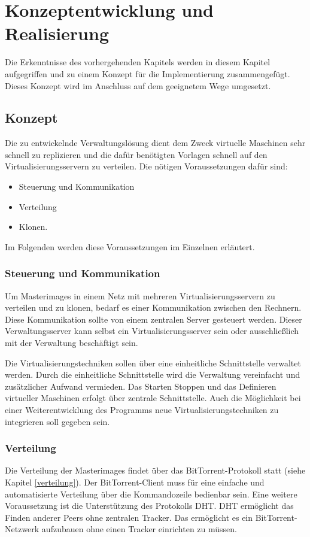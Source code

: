 \chapter{Konzeptentwicklung und Realisierung}
Die Erkenntnisse des vorhergehenden Kapitels werden in diesem Kapitel aufgegriffen und zu einem Konzept für die Implementierung zusammengefügt. Dieses Konzept wird im Anschluss auf dem geeignetem Wege umgesetzt.
\section{Konzept}
Die zu entwickelnde Verwaltungslösung dient dem Zweck virtuelle Maschinen sehr schnell zu replizieren und die dafür benötigten Vorlagen schnell auf den Virtualisierungsservern zu verteilen. Die nötigen Voraussetzungen dafür sind:
\begin{itemize}
\item{Steuerung und Kommunikation}
\item{Verteilung}
\item{Klonen.}
\end{itemize}
Im Folgenden werden diese Voraussetzungen im Einzelnen erläutert.

\subsection{Steuerung und Kommunikation}
Um Masterimages in einem Netz mit mehreren Virtualisierungsservern zu verteilen und zu klonen, bedarf es einer Kommunikation zwischen den Rechnern. Diese Kommunikation sollte von einem zentralen Server gesteuert werden. Dieser Verwaltungsserver kann selbst ein Virtualisierungsserver sein oder ausschließlich mit der Verwaltung beschäftigt sein.

Die Virtualisierungstechniken sollen über eine einheitliche Schnittstelle verwaltet werden. Durch die einheitliche Schnittstelle wird die Verwaltung vereinfacht und zusätzlicher Aufwand vermieden. Das Starten Stoppen und das Definieren virtueller Maschinen erfolgt über zentrale Schnittstelle. Auch die Möglichkeit bei einer Weiterentwicklung des Programms neue Virtualisierungstechniken zu integrieren soll gegeben sein.

\subsection{Verteilung}
Die Verteilung der Masterimages findet über das BitTorrent-Protokoll statt (siehe Kapitel \ref{verteilung}). Der BitTorrent-Client muss für eine einfache und automatisierte Verteilung über die Kommandozeile bedienbar sein. Eine weitere Voraussetzung ist die Unterstützung des Protokolls DHT. DHT ermöglicht das Finden anderer Peers ohne zentralen Tracker. Das ermöglicht es ein BitTorrent-Netzwerk aufzubauen ohne einen Tracker einrichten zu müssen.

